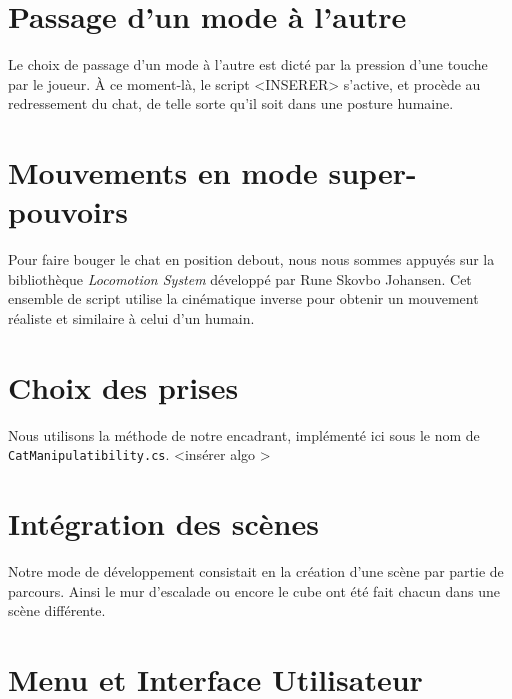 \documentclass[a4paper,11pt]{article}
\begin{document}
\section{Passage d'un mode à l’autre}
Le choix de passage d'un mode à l'autre est dicté par la pression d'une touche par le joueur. À ce moment-là, le script <INSERER> s'active, et procède au redressement du chat, de telle sorte qu'il soit dans une posture humaine. 

\section{Mouvements en mode super-pouvoirs}
Pour faire bouger le chat en position debout, nous nous sommes appuyés sur la bibliothèque \textit{Locomotion System} développé par Rune Skovbo Johansen. Cet ensemble de script utilise la cinématique inverse pour obtenir un mouvement réaliste et similaire à celui d'un humain.

\section{Choix des prises}
Nous utilisons la méthode de notre encadrant, implémenté ici sous le nom de \texttt{CatManipulatibility.cs}.
<insérer algo >

\section{Intégration des scènes}
Notre mode de développement consistait en la création d’une scène par partie de parcours. Ainsi le mur d’escalade ou encore le cube ont été fait chacun dans une scène différente. 

\section{Menu et Interface Utilisateur}


\end{document}
